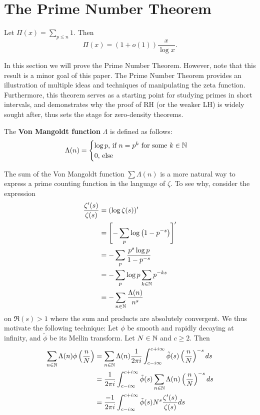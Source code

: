 \section{The Prime Number Theorem}

\begin{theorem}
    Let $\Pi(x)=\sum_{p\leq n} 1$. Then \[
        \Pi(x) = (1+o(1))\frac{x}{\log x}.
    \]
\end{theorem}

In this section we will prove the Prime Number Theorem.
However, note that this result is a minor goal of this paper.
The Prime Number Theorem provides an illustration of multiple ideas
and techniques of manipulating the zeta function.
Furthermore, this theorem serves as a starting point for
studying primes in short intervals, and demonstrates why the proof of
RH (or the weaker LH) is widely sought after, thus sets the stage for zero-density theorems.
\begin{definition}
    The \textbf{Von Mangoldt function} $\Lambda$ is defined as follows:
    \[
        \Lambda(n) = \begin{cases}
            \log p \textrm{, if $n = p^k$ for some $k\in\mathbb{N}$}\\
            0 \textrm{, else}
        \end{cases}
    \]
\end{definition}
The sum of the Von Mangoldt function $\sum\Lambda (n)$ is a more natural way to express
a prime counting function in the language of $\zeta$. To see why, consider the expression
\begin{align*}
    \frac{\zeta '(s)}{\zeta(s)} &= (\log\zeta(s))'\\
    &= \left[ -\sum_{p} \log\left(1-p^{-s}\right)\right]^{\prime}\\
    &= - \sum_{p} \frac{p^s \log p }{1-p^{-s}}\\
    &= -\sum_{p} \log p \sum_{k\in\mathbb{N}} p^{-ks}\\
    &= - \sum_{n\in\mathbb{N}} \frac{\Lambda(n)}{n^s}
\end{align*}
on $\Re(s)>1$ where the sum and products are absolutely convergent. We thus motivate the following technique:
Let $\phi$ be smooth and rapidly decaying at infinity, and $\tilde{\phi}$ be its Mellin transform. Let $N\in\mathbb{N}$ and $c\geq 2$. Then \begin{equation} \label{mellinonzeta}
    \begin{split}
    \sum_{n\in\mathbb{N}} \Lambda(n) \phi\left(\frac{n}{N}\right) &=
    \sum_{n\in\mathbb{N}} \Lambda(n) \frac{1}{2\pi i}\int_{c-i\infty}^{c+i\infty}
    \tilde{\phi}(s)\left(\frac{n}{N}\right)^{-s} ds \\
    &= \frac{1}{2\pi i}\int_{c-i\infty}^{c+i\infty}
    \tilde{\phi}(s)\sum_{n\in\mathbb{N}} \Lambda(n) \left(\frac{n}{N}\right)^{-s} ds \\
    &= \frac{-1}{2\pi i}\int_{c-i\infty}^{c+i\infty}
    \tilde{\phi}(s) N^s \frac{\zeta'(s)}{\zeta(s)} ds \\
    \end{split}
\end{equation}
